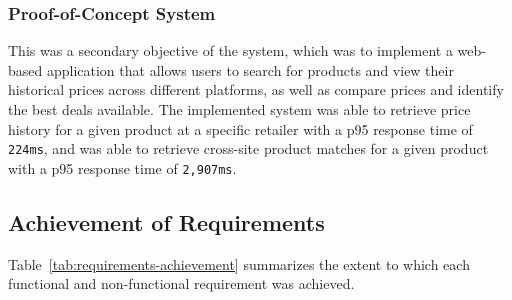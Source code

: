 \subsubsection{Proof-of-Concept System}
This was a secondary objective of the system, which was to implement a web-based application that allows users to search for products and view their historical prices across different platforms, as well as compare prices and identify the best deals available.
The implemented system was able to retrieve price history for a given product at a specific retailer with a p95 response time of \texttt{224ms}, and was able to retrieve cross-site product matches for a given product with a p95 response time of \texttt{2,907ms}.

\subsection{Achievement of Requirements}\label{subsec:achievement_of_requirements}

Table~\ref{tab:requirements-achievement} summarizes the extent to which each functional and non-functional requirement was achieved.

